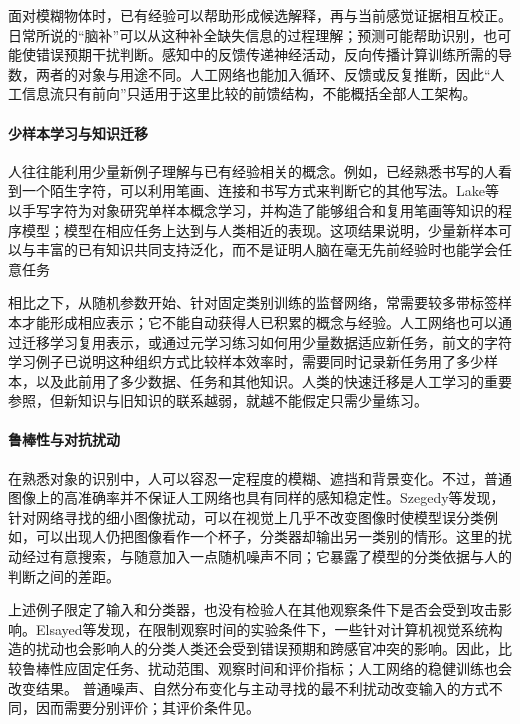 面对模糊物体时，已有经验可以帮助形成候选解释，再与当前感觉证据相互校正。日常所说的“脑补”可以从这种补全缺失信息的过程理解；预测可能帮助识别，也可能使错误预期干扰判断。感知中的反馈传递神经活动，反向传播计算训练所需的导数，两者的对象与用途不同。人工网络也能加入循环、反馈或反复推断，因此“人工信息流只有前向”只适用于这里比较的前馈结构，不能概括全部人工架构。

\paragraph{少样本学习与知识迁移}
人往往能利用少量新例子理解与已有经验相关的概念。例如，已经熟悉书写的人看到一个陌生字符，可以利用笔画、连接和书写方式来判断它的其他写法。Lake等以手写字符为对象研究单样本概念学习，并构造了能够组合和复用笔画等知识的程序模型；模型在相应任务上达到与人类相近的表现。这项结果说明，少量新样本可以与丰富的已有知识共同支持泛化，而不是证明人脑在毫无先前经验时也能学会任意任务

相比之下，从随机参数开始、针对固定类别训练的监督网络，常需要较多带标签样本才能形成相应表示；它不能自动获得人已积累的概念与经验。人工网络也可以通过迁移学习复用表示，或通过元学习练习如何用少量数据适应新任务，前文的字符学习例子已说明这种组织方式比较样本效率时，需要同时记录新任务用了多少样本，以及此前用了多少数据、任务和其他知识。人类的快速迁移是人工学习的重要参照，但新知识与旧知识的联系越弱，就越不能假定只需少量练习。

\paragraph{鲁棒性与对抗扰动}
在熟悉对象的识别中，人可以容忍一定程度的模糊、遮挡和背景变化。不过，普通图像上的高准确率并不保证人工网络也具有同样的感知稳定性。Szegedy等发现，针对网络寻找的细小图像扰动，可以在视觉上几乎不改变图像时使模型误分类例如，可以出现人仍把图像看作一个杯子，分类器却输出另一类别的情形。这里的扰动经过有意搜索，与随意加入一点随机噪声不同；它暴露了模型的分类依据与人的判断之间的差距。

上述例子限定了输入和分类器，也没有检验人在其他观察条件下是否会受到攻击影响。Elsayed等发现，在限制观察时间的实验条件下，一些针对计算机视觉系统构造的扰动也会影响人的分类人类还会受到错误预期和跨感官冲突的影响。因此，比较鲁棒性应固定任务、扰动范围、观察时间和评价指标；人工网络的稳健训练也会改变结果。
普通噪声、自然分布变化与主动寻找的最不利扰动改变输入的方式不同，因而需要分别评价；其评价条件见。

